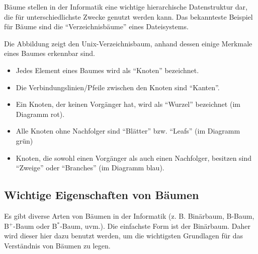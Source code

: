       B\"aume stellen in der Informatik eine wichtige hierarchische
      Datenstruktur dar, die f\"ur unterschiedlichste Zwecke genutzt werden
      kann. Das bekannteste Beispiel f\"ur B\"aume sind die
      \enquote{Verzeichnisb\"aume} eines Dateisystems.
      \begin{center}
      \end{center}
      Die Abbildung zeigt den Unix-Verzeichnisbaum, anhand dessen einige
      Merkmale eines Baumes erkennbar sind.
      \begin{itemize}
        \item Jedes Element eines Baumes wird als \enquote{Knoten} bezeichnet.
        \item Die Verbindungslinien/Pfeile zwischen den Knoten sind
        \enquote{Kanten}.
        \item Ein Knoten, der keinen Vorg\"anger hat, wird als
        \enquote{Wurzel} bezeichnet (im Diagramm rot).
        \item Alle Knoten ohne Nachfolger sind \enquote{Bl\"atter} bzw.
        \enquote{Leafs} (im Diagramm gr\"un)
        \item Knoten, die sowohl einen Vorg\"anger als auch einen Nachfolger,
        besitzen sind \enquote{Zweige} oder \enquote{Branches} (im Diagramm blau).
      \end{itemize}
      \subsection{Wichtige Eigenschaften von B\"aumen}
        Es gibt diverse Arten von B\"aumen in der Informatik (z. B.
        Bin\"arbaum, B-Baum, B$^+$-Baum oder B$^*$-Baum, uvm.). Die einfachste
        Form ist der Bin\"arbaum. Daher wird dieser hier dazu benutzt werden,
        um die wichtigsten Grundlagen f\"ur das Verst\"andnis von B\"aumen zu
        legen.

